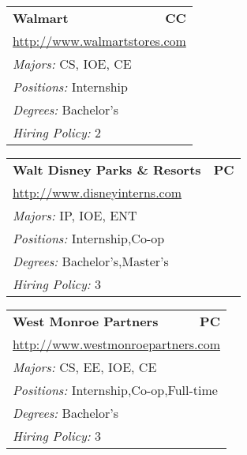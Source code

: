 \documentclass[twoside]{article}
\begin{document}
\begin{center}
\begin{multicols}{3}
\begin{FlushLeft}
\begin{minipage}{.9\columnwidth}
\end{minipage}
 
\begin{minipage}{.9\columnwidth}\begin{tabularx}{.95\columnwidth}{Xr}
                 {\Large\bf Walmart} & {\Large\bf CC}\\
    \multicolumn{2}{p{.95\columnwidth}}{\url{http://www.walmartstores.com}}\\
    \multicolumn{2}{p{.95\columnwidth}}{\emph{Majors:} CS, IOE, CE}\\
    \multicolumn{2}{p{.95\columnwidth}}{\emph{Positions:} Internship}\\
    \multicolumn{2}{p{.95\columnwidth}}{\emph{Degrees:} Bachelor's}\\
    \multicolumn{2}{p{.95\columnwidth}}{\emph{Hiring Policy:} 2}\\
    \end{tabularx}
    
\end{minipage}
 
\begin{minipage}{.9\columnwidth}\begin{tabularx}{.95\columnwidth}{Xr}
                 {\Large\bf Walt Disney Parks \& Resorts} & {\Large\bf PC}\\
    \multicolumn{2}{p{.95\columnwidth}}{\url{http://www.disneyinterns.com}}\\
    \multicolumn{2}{p{.95\columnwidth}}{\emph{Majors:} IP, IOE, ENT}\\
    \multicolumn{2}{p{.95\columnwidth}}{\emph{Positions:} Internship,Co-op}\\
    \multicolumn{2}{p{.95\columnwidth}}{\emph{Degrees:} Bachelor's,Master's}\\
    \multicolumn{2}{p{.95\columnwidth}}{\emph{Hiring Policy:} 3}\\
    \end{tabularx}
    
\end{minipage}
 
\begin{minipage}{.9\columnwidth}\begin{tabularx}{.95\columnwidth}{Xr}
                 {\Large\bf West Monroe Partners} & {\Large\bf PC}\\
    \multicolumn{2}{p{.95\columnwidth}}{\url{http://www.westmonroepartners.com}}\\
    \multicolumn{2}{p{.95\columnwidth}}{\emph{Majors:} CS, EE, IOE, CE}\\
    \multicolumn{2}{p{.95\columnwidth}}{\emph{Positions:} Internship,Co-op,Full-time}\\
    \multicolumn{2}{p{.95\columnwidth}}{\emph{Degrees:} Bachelor's}\\
    \multicolumn{2}{p{.95\columnwidth}}{\emph{Hiring Policy:} 3}\\
    \end{tabularx}
    

\end{minipage}
\end{FlushLeft}
\end{multicols}
\end{center}
\end{document}
